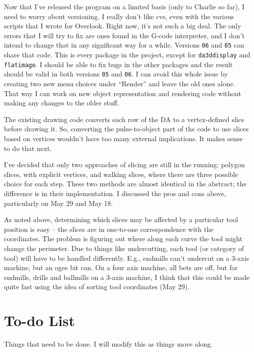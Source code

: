 \documentclass[titlepage,oneside,10pt]{article}
\begin{document}
Now that I've released the program on a limited basis (only to Charlie
so far), I need to worry about versioning. I really don't like cvs,
even with the various scripts that I wrote for Overlook. Right now,
it's not such a big deal. The only errors that I will try to fix are
ones found in the G-code interpreter, and I don't intend to change
that in any significant way for a while. Versions {\tt 06} and 
{\tt 05} can share that code. This is every package in the project,
except for {\tt da3ddisplay} and {\tt flatimage}. I should be able to
fix bugs in the other packages and the result should be valid in both
versions {\tt 05} and {\tt 06}. I can avoid this whole issue by
creating two new menu choices under ``Render'' and leave the old ones
alone. That way I can work on new object representation and rendering
code without making any changes to the older stuff.

The existing drawing code converts each row of the DA to a
vertex-defined slice before drawing it. So, converting the
pulse-to-object part of the code to use slices based on vertices
wouldn't have too many external implications. It makes sense to do
that next. 

I've decided that only two approaches of slicing are still in the
running: polygon slices, with explicit vertices, and walking slices,
where there are three possible choice for each step. These two methods
are almost identical in the abstract; the difference is in their
implementation. I discussed the pros and cons above, particularly on
May 29 and May 18.

As noted above, determining which slices may be affected by a
particular tool position is easy -- the slices are in one-to-one
correspondence with the coordinates. The problem is figuring out where
along each curve the tool might change the perimeter. Due to things
like undercutting, each tool (or category of tool) will have to be
handled differently. E.g., endmills can't undercut on a 3-axis
machine, but an ogee bit can. On a four axis machine, all bets are
off, but for endmills, drills and ballmills on a 3-axis machine, I
think that this could be made quite fast using the idea of sorting
tool coordinates (May 29).


\section{To-do List}

Things that need to be done. I will modify this as things move along.
\end{document}
